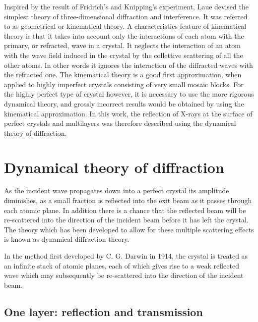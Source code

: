 \documentclass[12pt,oneside,notitlepage,abstracton,a4paper]{scrartcl}
\begin{document}
Inspired by the result of Fridrich's and Knipping's experiment, Laue devised the simplest theory of three-dimensional diffraction and interference. It was referred to as geometrical or kinematical theory. A characteristics feature of kinematical theory is that it takes into account only the interactions of each atom with the primary, or refracted, wave in a crystal. It neglects the interaction of an atom with the wave field induced in the crystal by the collettive scattering of all the other atoms. In other words it ignores the interaction of the diffracted waves with the refracted one. The kinematical theory is a good first approximation, when applied to highly imperfect crystals consisting of very small mosaic blocks. For the highly perfect type of crystal however, it is necessary to use the more rigorous dynamical theory, and grossly incorrect results would be obtained by using the kinematical approximation.
In this work, the reflection of X-rays at the surface of perfect crystals and multilayers was therefore described using the dynamical theory of diffraction.


\section{Dynamical theory of diffraction}
As the incident wave propagates down into a perfect crystal its amplitude diminishes, as a small fraction is reflected into the exit beam as it passes through each atomic plane. In addition there is a chance that the reflected beam will be re-scattered into the direction of the incident beam before it has left the crystal. The theory which has been developed to allow for these multiple scattering effects is known as dynamical diffraction theory.

In the method first developed by C. G. Darwin in 1914, the crystal is treated as an infinite stack of atomic planes, each of which gives rise to a weak reflected wave which may subsequently be re-scattered into the direction of the incident beam.


\subsection{One layer: reflection and transmission}\label{onelayer}
\end{document}
